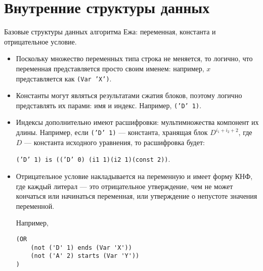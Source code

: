 \documentclass[12pt]{article}
\begin{document}
\section{Внутренние структуры данных}

Базовые структуры данных алгоритма Ежа: переменная, константа и отрицательное условие.

\begin{itemize}
\item Поскольку множество переменных типа строка не меняется, то логично, что переменная представляется просто своим именем: например, $x$ представляется как \texttt{(Var 'X')}.
\item Константы могут являться результатами сжатия блоков, поэтому логично представлять их парами: имя и индекс. Например, \texttt{('D' 1)}.
\item Индексы дополнительно имеют расшифровки: мультимножества компонент их длины. Например, если \texttt{('D' 1)} --- константа, хранящая блок $D^{i_1 + i_2+2}$, где $D$ --- константа исходного уравнения, то расшифровка будет: 

\texttt{('D' 1) is (('D' 0) (i1 1)(i2 1)(const 2))}.
\item Отрицательное условие накладывается на переменную и имеет форму КНФ, где каждый литерал --- это отрицательное утверждение, чем не может кончаться или начинаться переменная, или утверждение о непустоте значения переменной. 

Например, \begin{verbatim}
(OR 
    (not ('D' 1) ends (Var 'X')) 
    (not ('A' 2) starts (Var 'Y'))
)
\end{verbatim}
\end{itemize}
\end{document}
